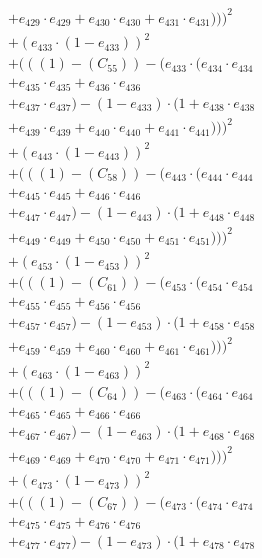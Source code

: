 \documentclass[10pt, a4paper]{article}
\begin{document}
\begin{small}
\begin{align*}
& + e_{429} \cdot e_{429} + e_{430} \cdot e_{430} + e_{431} \cdot e_{431})))^{2} \\
& + (e_{433} \cdot (1 - e_{433}))^{2} \\
& + (((1) - (C_{55})) - (e_{433} \cdot (e_{434} \cdot e_{434} \\
& + e_{435} \cdot e_{435} + e_{436} \cdot e_{436} \\
& + e_{437} \cdot e_{437}) - (1 - e_{433}) \cdot (1 + e_{438} \cdot e_{438} \\
& + e_{439} \cdot e_{439} + e_{440} \cdot e_{440} + e_{441} \cdot e_{441})))^{2} \\
& + (e_{443} \cdot (1 - e_{443}))^{2} \\
& + (((1) - (C_{58})) - (e_{443} \cdot (e_{444} \cdot e_{444} \\
& + e_{445} \cdot e_{445} + e_{446} \cdot e_{446} \\
& + e_{447} \cdot e_{447}) - (1 - e_{443}) \cdot (1 + e_{448} \cdot e_{448} \\
& + e_{449} \cdot e_{449} + e_{450} \cdot e_{450} + e_{451} \cdot e_{451})))^{2} \\
& + (e_{453} \cdot (1 - e_{453}))^{2} \\
& + (((1) - (C_{61})) - (e_{453} \cdot (e_{454} \cdot e_{454} \\
& + e_{455} \cdot e_{455} + e_{456} \cdot e_{456} \\
& + e_{457} \cdot e_{457}) - (1 - e_{453}) \cdot (1 + e_{458} \cdot e_{458} \\
& + e_{459} \cdot e_{459} + e_{460} \cdot e_{460} + e_{461} \cdot e_{461})))^{2} \\
& + (e_{463} \cdot (1 - e_{463}))^{2} \\
& + (((1) - (C_{64})) - (e_{463} \cdot (e_{464} \cdot e_{464} \\
& + e_{465} \cdot e_{465} + e_{466} \cdot e_{466} \\
& + e_{467} \cdot e_{467}) - (1 - e_{463}) \cdot (1 + e_{468} \cdot e_{468} \\
& + e_{469} \cdot e_{469} + e_{470} \cdot e_{470} + e_{471} \cdot e_{471})))^{2} \\
& + (e_{473} \cdot (1 - e_{473}))^{2} \\
& + (((1) - (C_{67})) - (e_{473} \cdot (e_{474} \cdot e_{474} \\
& + e_{475} \cdot e_{475} + e_{476} \cdot e_{476} \\
& + e_{477} \cdot e_{477}) - (1 - e_{473}) \cdot (1 + e_{478} \cdot e_{478} \\

\end{align*}
\end{small}
\end{document}
